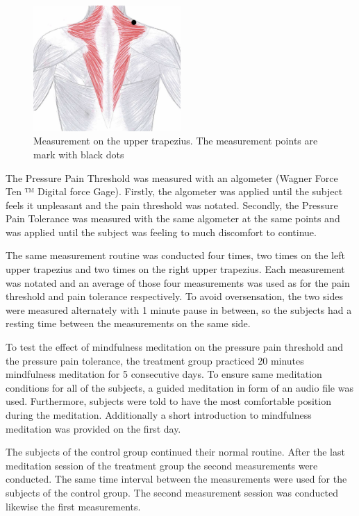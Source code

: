 \begin{figure}[H]
	\includegraphics[width=0.5\textwidth]{figures/trapezius} 
	\caption{Measurement on the upper trapezius. The measurement points are mark with black dots}
	\label{fig:trapezius}  
\end{figure}  

The Pressure Pain Threshold was measured with an algometer (Wagner Force Ten ™  Digital force Gage). Firstly, the algometer was applied until the subject feels it unpleasant and the pain threshold was notated. Secondly, the Pressure Pain Tolerance was measured with the same algometer at the same points and was applied until the subject was feeling to much discomfort to continue.

The same measurement routine was conducted four times, two times on the left upper trapezius and two times on the right upper trapezius. Each measurement was notated and an average of those four measurements was used as for the pain threshold and pain tolerance respectively. To avoid oversensation, the two sides were measured alternately with 1 minute pause in between, so the subjects had a resting time between the measurements on the same side.  

To test the effect of mindfulness meditation on the pressure pain threshold and the pressure pain tolerance, the treatment group practiced 20 minutes mindfulness meditation for 5 consecutive days. To ensure same meditation conditions for all of the subjects, a guided meditation in form of an audio file was used. Furthermore, subjects were told to have the most comfortable position during the meditation.  Additionally a short introduction to mindfulness meditation was provided on the first day. 

The subjects of the control group continued their normal routine.
After the last meditation session of the treatment group the second measurements were conducted. The same time interval between the measurements were used for the subjects of the control group. The second measurement session was conducted likewise the first measurements.



